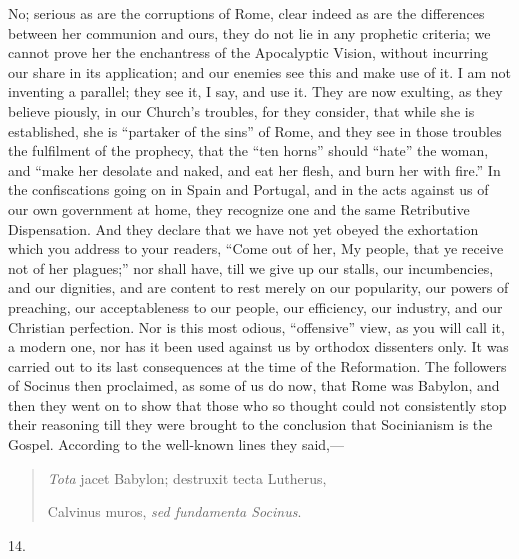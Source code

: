 No; serious as are the corruptions of Rome, clear
indeed as are the differences between her communion and ours, they do
not lie in any prophetic criteria; we cannot prove her the enchantress
of the Apocalyptic Vision, without incurring our share in its
application; and our enemies see this and make use of it. I am not
inventing a parallel; they see it, I say, and use it. They are now
exulting, as they believe piously, in our Church's troubles, for
they consider, that while she is established, she is ``partaker of
the sins'' of Rome, and they see in those troubles the fulfilment of
the prophecy, that the ``ten horns'' should ``hate'' the woman,
and ``make her desolate and naked, and eat her flesh, and burn her
with fire.'' In the confiscations going on in Spain and Portugal, and
in the acts against us of our own government at home, they recognize
one and the same Retributive Dispensation. And they declare that we
have not yet obeyed the exhortation which you address to your readers,
``Come out of her, My people, that ye receive not of her
plagues;'' nor shall have, till we give up our stalls, our
incumbencies, and our dignities, and are content to rest merely on our
popularity, our powers of preaching, our acceptableness to our people,
our efficiency, our industry, and our Christian perfection. Nor is
this most odious, ``offensive'' view, as you will call it, a modern
one, nor has it been used against us by orthodox dissenters only. It
was carried out to its last consequences at the time of the
Reformation. The followers of Socinus then proclaimed, as some of us
do now, that Rome was Babylon, and then they went on to show that
those who so thought could not consistently stop their reasoning till
they were brought to the conclusion that Socinianism is the Gospel.
According to the well-known lines they said,—

\begin{quote}

\emph{Tota} jacet Babylon; destruxit tecta
Lutherus,

Calvinus muros, \emph{sed fundamenta Socinus}.

\end{quote}

14.

